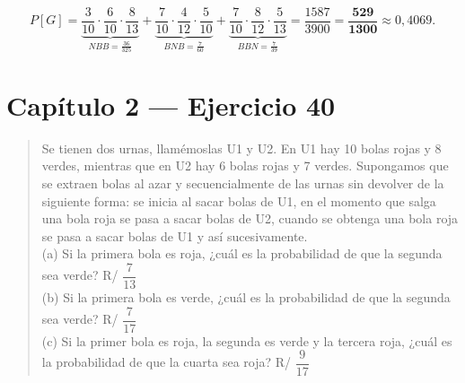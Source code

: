 \documentclass[11pt]{article}
\begin{document}
\begin{resp}
\[
P[G]=\underbrace{\frac{3}{10}\cdot\frac{6}{10}\cdot\frac{8}{13}}_{NBB=\frac{36}{325}}
+\underbrace{\frac{7}{10}\cdot\frac{4}{12}\cdot\frac{5}{10}}_{BNB=\frac{7}{60}}
+\underbrace{\frac{7}{10}\cdot\frac{8}{12}\cdot\frac{5}{13}}_{BBN=\frac{7}{39}}
=\frac{1587}{3900}=\mathbf{\frac{529}{1300}}\approx 0{,}4069 .
\]
\end{resp}

\section*{Cap\'itulo 2 --- Ejercicio 40}

\begin{quote}
Se tienen dos urnas, llam\'emoslas U1 y U2. En U1 hay 10 bolas rojas y 8 verdes, mientras que en U2 hay 6 bolas rojas y 7 verdes. Supongamos que se extraen bolas al azar y secuencialmente de las urnas sin devolver de la siguiente forma: se inicia al sacar bolas de U1, en el momento que salga una bola roja se pasa a sacar bolas de U2, cuando se obtenga una bola roja se pasa a sacar bolas de U1 y as\'i sucesivamente.\\
(a) Si la primera bola es roja, ¿cu\'al es la probabilidad de que la segunda sea verde? \hfill R/ $\dfrac{7}{13}$\\
(b) Si la primera bola es verde, ¿cu\'al es la probabilidad de que la segunda sea verde? \hfill R/ $\dfrac{7}{17}$\\
(c) Si la primer bola es roja, la segunda es verde y la tercera roja, ¿cu\'al es la probabilidad de que la cuarta sea roja? \hfill R/ $\dfrac{9}{17}$
\end{quote}
\end{document}
